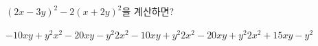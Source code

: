 $(2x-3y)^2-2(x+2y)^2$을 계산하면?
\begin{choicesii}{$-10xy+y^2$}{$x^2-20xy-y^2$}{$2x^2-10xy+y^2$}{$2x^2-20xy+y^2$}{$2x^2+15xy-y^2$}\end{choicesii}

